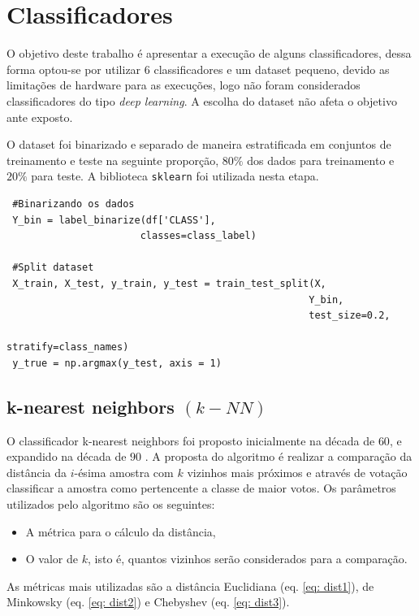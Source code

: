 \documentclass[
	article,			%
	11pt,				%
	oneside,			%
	a4paper,			%
	english,			%
	brazil,				%
	sumario=tradicional
	]{abntex2}
\begin{document}
\newpage
\section{Classificadores}

O objetivo deste trabalho é apresentar a execução de alguns classificadores, dessa forma optou-se por utilizar $6$ classificadores e um dataset pequeno, devido as limitações de hardware para as execuções, logo não foram considerados classificadores do tipo \textit{ deep learning}. A escolha do dataset não afeta o objetivo ante exposto. 

O dataset foi binarizado e separado de maneira estratificada em conjuntos de treinamento e teste na seguinte proporção, $80\%$ dos dados para treinamento e $20\%$ para teste. A biblioteca \verb|sklearn| foi utilizada nesta etapa.

\begin{verbatim}
 #Binarizando os dados
 Y_bin = label_binarize(df['CLASS'], 
                       classes=class_label)
 
 #Split dataset
 X_train, X_test, y_train, y_test = train_test_split(X,
                                                    Y_bin, 
                                                    test_size=0.2,
                                                    stratify=class_names)
 y_true = np.argmax(y_test, axis = 1)
\end{verbatim}


\subsection{k-nearest neighbors $(k-NN)$}

O classificador k-nearest neighbors foi proposto inicialmente na década de $60$, e expandido na década de $90$ \cite{KNN}. A proposta do algoritmo é realizar a comparação da distância da $i$-ésima amostra com $k$ vizinhos mais próximos e através de votação classificar a amostra como pertencente a classe de maior votos. Os parâmetros utilizados pelo algoritmo são os seguintes:
\begin{itemize}
 \item A métrica para o cálculo da distância,
 \item O valor de $k$, isto é, quantos vizinhos serão considerados para a comparação.
\end{itemize}

As métricas mais utilizadas são a distância Euclidiana (eq. \ref{eq: dist1}), de Minkowsky (eq. \ref{eq: dist2}) e Chebyshev (eq. \ref{eq: dist3}).
\end{document}
